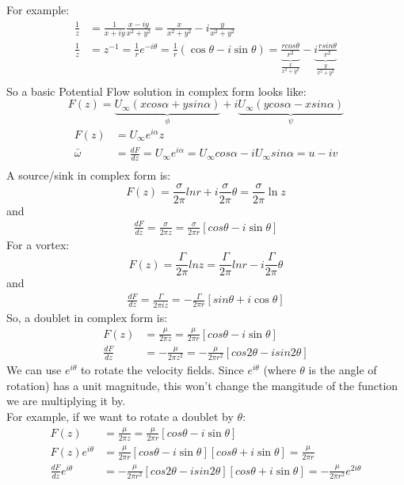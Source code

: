 \documentclass{article}
\begin{document}
For example:
\begin{align*}
    \frac{1}{z}&=\frac{1}{x+iy}\frac{x-iy}{x^2+y^2}=\frac{x}{x^2+y^2}-i\frac{y}{x^2+y^2} \\
    \frac{1}{z}&=z^{-1}=\frac{1}{r}e^{-i\theta}=\frac{1}{r}(\cos\theta-i\sin\theta)=\underbrace{\frac{rcos\theta}{r^2}}_{\frac{x}{x^2+y^2}}-\underbrace{i\frac{rsin\theta}{r^2}}_{\frac{y}{x^2+y^2}}\\
\end{align*}
So a basic Potential Flow solution in complex form looks like:
\begin{equation}
    F(z)=\underbrace{U_\infty(xcos\alpha+ysin\alpha)}_\phi+i\underbrace{U_\infty(ycos\alpha-xsin\alpha)}_\psi
\end{equation}
\begin{align*}
    F(z)&=U_\infty e^{i\alpha}z \\
    \bar{\omega}&=\frac{dF}{dz}=U_\infty e^{i\alpha}=U_\infty cos\alpha-iU_\infty sin\alpha=u-iv\\
\end{align*}
A source/sink in complex form is:
\begin{equation}
    F(z)=\frac{\sigma}{2\pi}lnr+i\frac{\sigma}{2\pi}\theta=\frac{\sigma}{2\pi}\ln z
\end{equation}
and
\begin{align*}
    \frac{dF}{dz}=\frac{\sigma}{2\pi z}=\frac{\sigma}{2\pi r}[cos\theta-i\sin\theta]
\end{align*}
For a vortex:
\begin{equation}
    F(z)=\frac{\Gamma}{2\pi}lnz=\frac{\Gamma}{2\pi}lnr-i\frac{\Gamma}{2\pi}\theta
\end{equation}
and
\begin{align*}
    \frac{dF}{dz}=\frac{\Gamma}{2\pi iz}=-\frac{\Gamma}{2\pi r}[sin\theta+i\cos\theta]
\end{align*}
So, a doublet in complex form is:
\begin{align}
    F(z)&=\frac{\mu}{2\pi z}=\frac{\mu}{2\pi r}[cos\theta-i\sin\theta] \\
    \frac{dF}{dz}&=-\frac{\mu}{2\pi z^2}=-\frac{\mu}{2\pi r^2}[cos2\theta-isin2\theta]
\end{align}
We can use $e^{i\theta}$ to rotate the velocity fields. Since $e^{i\theta}$ (where $\theta$ is the angle of rotation) has a unit magnitude, this won't change the mangitude of the function we are multiplying it by.\\
For example, if we want to rotate a doublet by $\theta$:
\begin{align*}
    F(z)&=\frac{\mu}{2\pi z}=\frac{\mu}{2\pi r}[cos\theta-i\sin\theta] \\
    F(z)e^{i\theta}&=\frac{\mu}{2\pi r}[cos\theta-i\sin\theta][cos\theta+i\sin\theta]=\frac{\mu}{2\pi r} \\
    \frac{dF}{dz}e^{i\theta}&=-\frac{\mu}{2\pi r^2}[cos2\theta-isin2\theta][cos\theta+i\sin\theta]=-\frac{\mu}{2\pi r^2}e^{2i\theta}
\end{align*}
\end{document}
